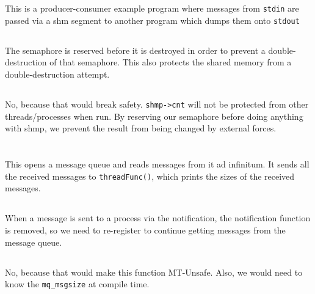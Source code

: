 \documentclass[a4paper,11pt]{article}
\def\code#1{\texttt{#1}}
\begin{document}
\section{}
\subsection{}
This is a producer-consumer example program where messages from \code{stdin} are passed
via a shm segment to another program which dumps them onto \code{stdout}
\subsection{}
The semaphore is reserved before it is destroyed in order to prevent a double-destruction
of that semaphore.
This also protects the shared memory from a double-destruction attempt.
\subsection{}
No, because that would break safety.
\code{shmp->cnt} will not be protected from other threads/processes when run.
By reserving our semaphore before doing anything with shmp, we prevent the result
from being changed by external forces.

\section{}
\subsection{}
This opens a message queue and reads messages from it ad infinitum.
It sends all the received messages to \code{threadFunc()}, which prints the sizes of
the received messages.
\subsection{}
When a message is sent to a process via the notification, the notification
function is removed, so we need to re-register to continue getting messages
from the message queue.
\subsection{}
No, because that would make this function MT-Unsafe.
Also, we would need to know the \code{mq\_msgsize} at compile time.

\section{}
\end{document}
